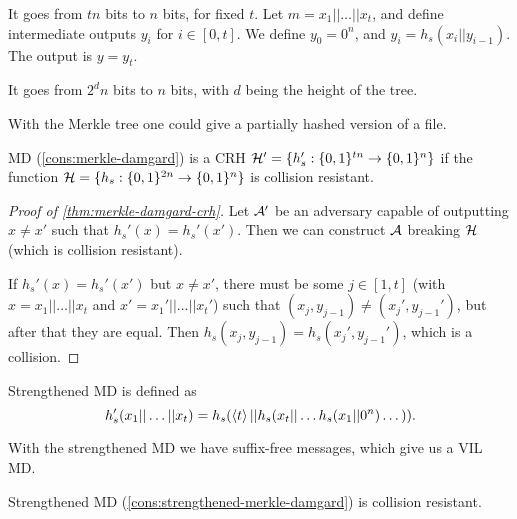 \begin{construction}[\acl{MD}] \label{cons:merkle-damgard}
	It goes from $tn$ bits to $n$ bits, for fixed $t$.
	Let $m = x_1 || \dots || x_t$, and define intermediate outputs $y_i$ for $i \in [0,t]$.
	We define $y_0 = 0^n$, and $y_i = h_s(x_i || y_{i-1})$.
	The output is $y = y_t$.
\end{construction}

\begin{construction}
	It goes from $2^d n$ bits to $n$ bits, with $d$ being the height of the tree.
\end{construction}
With the Merkle tree one could give a partially hashed version of a file.

\begin{theorem} \label{thm:merkle-damgard-crh}
	\ac{MD} (\cref{cons:merkle-damgard}) is a \ac{CRH} $\mathcal{H}' = \{ h_s' : \{0,1\}^{tn} \to \{0,1\}^{n} \}$ if the function $\mathcal{H} = \{ h_s : \{0,1\}^{2n} \to \{0,1\}^{n} \}$ is collision resistant.
\end{theorem}

\begin{proof}[Proof of \cref{thm:merkle-damgard-crh}]
	Let $\mathcal{A}'$ be an adversary capable of outputting $x \neq x'$ such that $h_s'(x) = h_s'(x')$.
	Then we can construct $\mathcal{A}$ breaking $\mathcal{H}$ (which is collision resistant).

	If $h_s'(x) = h_s'(x')$ but $x \neq x'$, there must be some $j \in [1,t]$ (with $x = x_1 || \dots || x_t$ and $x' = x_1' || \dots || x_t'$) such that $(x_j, y_{j-1}) \neq (x_j', y_{j-1}')$, but after that they are equal.
	Then $h_s(x_j, y_{j-1}) = h_s(x_j', y_{j-1}')$, which is a collision.
\end{proof}

\begin{construction} \label{cons:strengthened-merkle-damgard}
	Strengthened \ac{MD} is defined as
	\begin{equation*}
		h_s'(x_1 || \dots || x_t) =
		h_s(\left< {t} \right> || h_s(x_t || \dots h_s(x_1 || 0^n) \dots)). \qedhere
	\end{equation*}
\end{construction}
With the strengthened \ac{MD} we have suffix-free messages, which give us a \ac{VIL} \ac{MD}.

\begin{theorem} \label{thm:strengthened-merkle-damgard-crh}
	Strengthened \ac{MD} (\cref{cons:strengthened-merkle-damgard}) is collision resistant.
\end{theorem}

